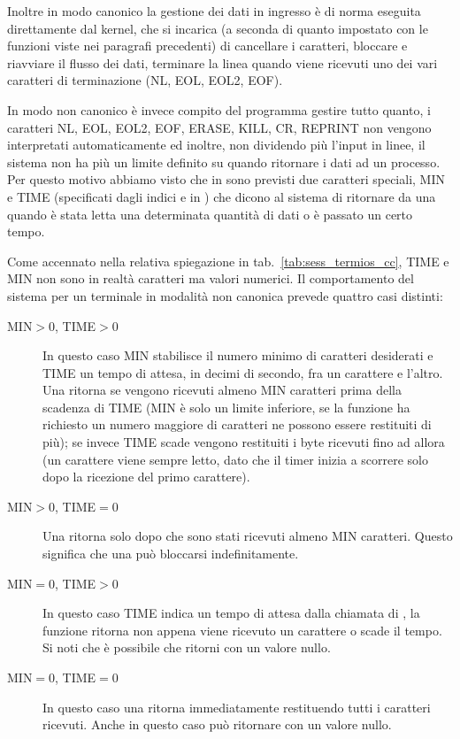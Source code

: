Inoltre in modo canonico la gestione dei dati in ingresso è di norma eseguita
direttamente dal kernel, che si incarica (a seconda di quanto impostato con le
funzioni viste nei paragrafi precedenti) di cancellare i caratteri, bloccare e
riavviare il flusso dei dati, terminare la linea quando viene ricevuti uno dei
vari caratteri di terminazione (NL, EOL, EOL2, EOF).

In modo non canonico è invece compito del programma gestire tutto quanto, i
caratteri NL, EOL, EOL2, EOF, ERASE, KILL, CR, REPRINT non vengono
interpretati automaticamente ed inoltre, non dividendo più l'input in linee,
il sistema non ha più un limite definito su quando ritornare i dati ad un
processo. Per questo motivo abbiamo visto che in  sono previsti due
caratteri speciali, MIN e TIME (specificati dagli indici  e
 in ) che dicono al sistema di ritornare da una
 quando è stata letta una determinata quantità di dati o è passato
un certo tempo.

Come accennato nella relativa spiegazione in tab.~\ref{tab:sess_termios_cc},
TIME e MIN non sono in realtà caratteri ma valori numerici. Il comportamento
del sistema per un terminale in modalità non canonica prevede quattro casi
distinti:
\begin{description}
\item[MIN$>0$, TIME$>0$] In questo caso MIN stabilisce il numero minimo di
  caratteri desiderati e TIME un tempo di attesa, in decimi di secondo, fra un
  carattere e l'altro. Una  ritorna se vengono ricevuti almeno MIN
  caratteri prima della scadenza di TIME (MIN è solo un limite inferiore, se
  la funzione ha richiesto un numero maggiore di caratteri ne possono essere
  restituiti di più); se invece TIME scade vengono restituiti i byte ricevuti
  fino ad allora (un carattere viene sempre letto, dato che il timer inizia a
  scorrere solo dopo la ricezione del primo carattere).
\item[MIN$>0$, TIME$=0$] Una  ritorna solo dopo che sono stati
  ricevuti almeno MIN caratteri. Questo significa che una  può
  bloccarsi indefinitamente. 
\item[MIN$=0$, TIME$>0$] In questo caso TIME indica un tempo di attesa dalla
  chiamata di , la funzione ritorna non appena viene ricevuto un
  carattere o scade il tempo. Si noti che è possibile che  ritorni
  con un valore nullo.
\item[MIN$=0$, TIME$=0$] In questo caso una  ritorna immediatamente
  restituendo tutti i caratteri ricevuti. Anche in questo caso può ritornare
  con un valore nullo.
\end{description}



